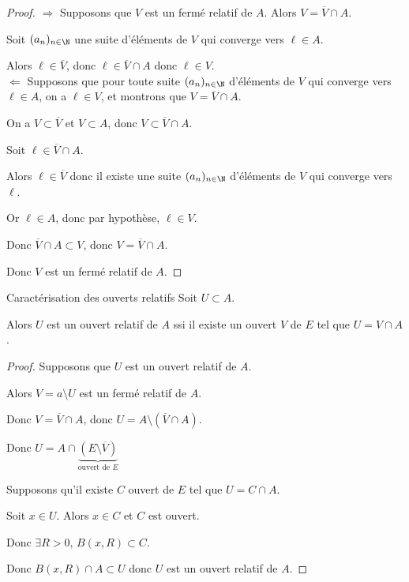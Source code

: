 \begin{proof}
    $\Rightarrow$ Supposons que $V$ est un fermé relatif de $A$. 
    Alors $V = \overline V \cap A$. 

    Soit $(a_n)_{n \in \N}$ une suite d'éléments de $V$ qui converge vers $\ell \in A$.

    Alors $\ell \in \overline V$, donc $\ell \in \overline V \cap A$ donc $\ell \in V$. \\

    $\Leftarrow$ Supposons que pour toute suite $(a_n)_{n \in \N}$ d'éléments de $V$ qui converge vers
    $\ell \in A$, on a $\ell \in V$, et montrons que $V = \overline V \cap A$. 

    On a $V \subset \overline V$ et $V \subset A$, donc $V \subset \overline V \cap A$.

    Soit $\ell \in \overline V \cap A$.

    Alors $\ell \in \overline V$ donc il existe une suite $(a_n)_{n \in \N}$ d'éléments de $V$ qui converge vers $\ell$.

    Or $\ell \in A$, donc par hypothèse, $\ell \in V$.

    Donc $\overline V \cap A \subset V$, donc $V = \overline V \cap A$.

    Donc $V$ est un fermé relatif de $A$.
\end{proof}


\begin{proposition}{Caractérisation des ouverts relatifs}{}
    Soit $U \subset A$. 

    Alors $U$ est un ouvert relatif de $A$ ssi il existe un ouvert $V$ de $E$ tel que 
    $U = V \cap A$.
    
\end{proposition}

\begin{proof}
    Supposons que $U$ est un ouvert relatif de $A$.

    Alors $V = a \setminus U$ est un fermé relatif de $A$.

    Donc $V = \overline V \cap A$, donc $U = A \setminus (\overline V \cap A)$. 

    Donc $U = A \cap \underbrace{(E \setminus \overline V)}_{\text{ouvert de } E}$

    \avspace Supposons qu'il existe $C$ ouvert de $E$ tel que $U = C \cap A$.

    Soit $x \in U$. Alors $x \in C$ et $C$ est ouvert.

    Donc $\exists R > 0, \, B(x, R) \subset C$.

    Donc $B(x, R) \cap A \subset U$ donc $U$ est un ouvert relatif de $A$.
\end{proof}



